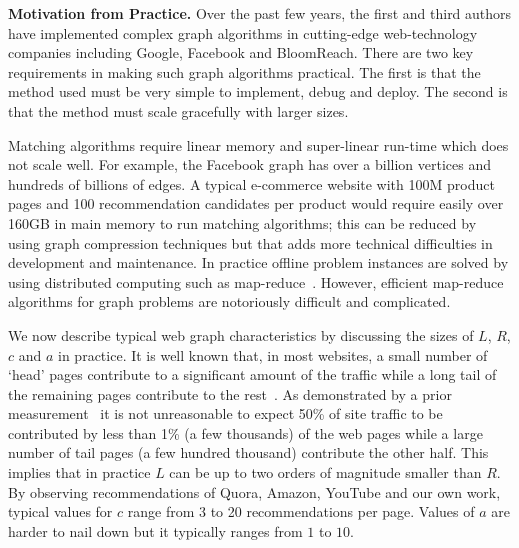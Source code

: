 \noindent
{\bf Motivation from Practice.} Over the past few years, the first and
third authors have implemented complex graph algorithms in
cutting-edge web-technology companies including Google, Facebook and
BloomReach. There are two key requirements in making such graph algorithms
practical. The first is that the method used must be very simple to
implement, debug and deploy. The second is that the method must scale
gracefully with larger sizes. \vs

Matching algorithms require linear memory and super-linear run-time
which does not scale well. For example, the Facebook graph has over a
billion vertices\cite{FacebookNodes} and hundreds of billions of edges. A typical
e-commerce website with 100M product pages and 100 recommendation candidates per
product would require easily over 160GB in main memory to run matching
algorithms; this can be reduced by using graph compression techniques but that adds more technical difficulties in development and maintenance. In practice offline problem instances are solved by using distributed computing such as map-reduce~\cite{DeanGhemawat2004}. However, efficient map-reduce algorithms for graph problems are notoriously difficult and complicated. \vs


We now describe typical web graph characteristics by discussing the sizes of $L$, $R$, $c$ and $a$ in practice. It is well known
that, in most websites,  a small number of `head' pages contribute to a
significant amount of the traffic while a long tail of the remaining
pages contribute to the rest~\cite{HubermanAdamic1999, DuDemmerBrewer2006}. As
demonstrated by a prior measurement~\cite{KumarNorrisSun2009}
it is not unreasonable to expect 50\% of site traffic to be
contributed by less than 1\% (a few thousands) of the web pages while a
large number of tail pages (a few hundred thousand) contribute
the other half. This implies that in practice $L$ can
be up to two orders of magnitude smaller than $R$.  By observing
recommendations of Quora, Amazon, YouTube and our own work,
typical values for $c$ range from 3 to 20 recommendations per page. Values of $a$ are harder to nail down but it typically ranges from $1$ to $10$. \vs


